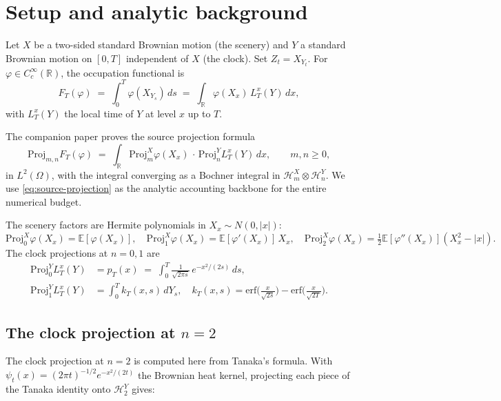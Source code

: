 \documentclass[11pt,reqno]{amsart}
\theoremstyle{plain}
\theoremstyle{definition}
\theoremstyle{remark}
\newcommand{\R}{\mathbb{R}}
\newcommand{\E}{\mathbb{E}}
\newcommand{\Proj}{\mathrm{Proj}}
\newcommand{\HX}[1]{\mathcal{H}^{X}_{#1}}
\newcommand{\HY}[1]{\mathcal{H}^{Y}_{#1}}
\newcommand{\Loc}{L}
\newcommand{\IBM}{Z}
\begin{document}
\section{Setup and analytic background}
\label{sec:setup}

Let $X$ be a two-sided standard Brownian motion (the scenery) and $Y$
a standard Brownian motion on $[0, T]$ independent of $X$ (the
clock). Set $\IBM_t = X_{Y_t}$. For $\varphi \in C_c^\infty(\R)$, the
occupation functional is
\[
  F_T(\varphi)
   \;=\; \int_0^T \varphi(X_{Y_s})\,ds
   \;=\; \int_\R \varphi(X_x)\,\Loc_T^x(Y)\,dx,
\]
with $\Loc_T^x(Y)$ the local time of $Y$ at level $x$ up to $T$.

The companion paper proves the source projection formula
\begin{equation}
  \Proj_{m, n} F_T(\varphi)
   \;=\; \int_\R \Proj^X_m \varphi(X_x)
        \,\cdot\, \Proj^Y_n \Loc_T^x(Y)\,dx,
   \qquad m, n \ge 0,
   \label{eq:source-projection}
\end{equation}
in $L^2(\Omega)$, with the integral converging as a Bochner integral
in $\HX{m} \otimes \HY{n}$. We use \eqref{eq:source-projection} as
the analytic accounting backbone for the entire numerical budget.

The scenery factors are Hermite polynomials in $X_x \sim N(0, |x|)$:
\begin{equation}
  \Proj^X_0 \varphi(X_x) = \E[\varphi(X_x)],\quad
  \Proj^X_1 \varphi(X_x) = \E[\varphi'(X_x)]\,X_x,\quad
  \Proj^X_2 \varphi(X_x) = \tfrac{1}{2}\E[\varphi''(X_x)](X_x^2 - |x|).
  \label{eq:scenery-proj}
\end{equation}
The clock projections at $n = 0, 1$ are
\begin{align}
  \Proj^Y_0 \Loc_T^x(Y)
   &= p_T(x) \;=\; \int_0^T \frac{1}{\sqrt{2 \pi s}}\,
     e^{-x^2/(2s)}\,ds,\\
  \Proj^Y_1 \Loc_T^x(Y)
   &= \int_0^T k_T(x, s)\,dY_s,\quad
   k_T(x, s) = \mathrm{erf}\!\bigl(\tfrac{x}{\sqrt{2s}}\bigr)
              - \mathrm{erf}\!\bigl(\tfrac{x}{\sqrt{2T}}\bigr).
\end{align}

\subsection{The clock projection at $n = 2$}
\label{sec:proj2-clock}
The clock projection at $n = 2$ is computed here from Tanaka's
formula. With $\psi_t(x) = (2 \pi t)^{-1/2} e^{-x^2/(2t)}$ the
Brownian heat kernel, projecting each piece of the Tanaka identity
onto $\HY{2}$ gives:
\end{document}
